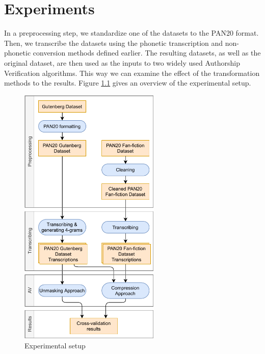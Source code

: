 \chapter{Experiments}\label{experiments}
In a preprocessing step, we standardize one of the datasets to the PAN20 format.
Then, we transcribe the datasets using the phonetic transcription and non-phonetic conversion methods defined earlier.
The resulting datasets, as well as the original dataset, are then used as the inputs to two widely used Authorship Verification algorithms.
This way we can examine the effect of the transformation methods to the results.
Figure \ref{fig:process} gives an overview of the experimental setup.

\begin{figure}
  \centering
  \includegraphics[width=0.6\textwidth]{figures/process}
  \caption{Experimental setup}
  \label{fig:process}
\end{figure}

